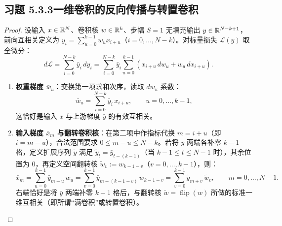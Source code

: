 \subsection*{习题 5.3.3\quad 一维卷积的反向传播与转置卷积}
\begin{proof}
设输入 $x \in \mathbb{R}^N$、卷积核 $w \in \mathbb{R}^k$、步幅 $S=1$ 无填充输出 $y \in \mathbb{R}^{N-k+1}$，前向互相关定义为 $y_i = \sum_{u=0}^{k-1} w_u x_{i+u}$（$i = 0, \dots, N-k$）。对标量损失 $\mathcal{L}(y)$ 取全微分：
\[
  d\mathcal{L} = \sum_{i=0}^{N-k} \bar{y}_i\, dy_i
  = \sum_{i=0}^{N-k} \bar{y}_i \sum_{u=0}^{k-1} (x_{i+u}\, dw_u + w_u\, dx_{i+u}).
\]
\begin{enumerate}[label=(\arabic*), leftmargin=1.8em]
  \item \textbf{权重梯度 $\bar{w}_u$}：交换第一项求和次序，读取 $dw_u$ 系数：
  \[
    \bar{w}_u = \sum_{i=0}^{N-k} \bar{y}_i\, x_{i+u}, \qquad u = 0, \dots, k-1,
  \]
  这恰好是输入 $x$ 与上游梯度 $\bar{y}$ 的有效互相关。

  \item \textbf{输入梯度 $\bar{x}_m$ 与翻转卷积核}：在第二项中作指标代换 $m = i + u$（即 $i = m - u$），合法范围要求 $0 \le m - u \le N - k$。若将 $\bar{y}$ 两端各补零 $k-1$ 格，定义扩展序列 $\tilde{y}$ 满足 $\tilde{y}_{t} = \bar{y}_{t-(k-1)}$（当 $k-1 \le t \le N-1$ 时），其余位置为 $0$，再定义空间翻转核 $\tilde{w}_v := w_{k-1-v}$（$v = 0, \dots, k-1$），则：
  \[
    \bar{x}_m = \sum_{u=0}^{k-1} \bar{y}_{m-u}\, w_u
    = \sum_{v=0}^{k-1} \bar{y}_{m - (k-1-v)}\, w_{k-1-v}
    = \sum_{v=0}^{k-1} \tilde{y}_{m+v}\, \tilde{w}_v, \qquad m = 0, \dots, N-1.
  \]
  右端恰好是将 $\bar{y}$ 两端补零 $k-1$ 格后，与翻转核 $\tilde{w} = \operatorname{flip}(w)$ 所做的标准一维互相关（即所谓“满卷积”或转置卷积）。
\end{enumerate}
\end{proof}

